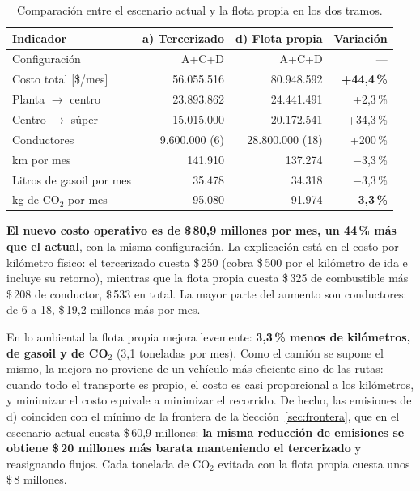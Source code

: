 \documentclass[10pt,a4paper]{article}
\begin{document}
\begin{table}[H]
\centering\small
\caption{Comparación entre el escenario actual y la flota propia en los dos tramos.}
\label{tab:pd}
\begin{tabular}{lrrr}
\toprule
\textbf{Indicador} & \textbf{a) Tercerizado} & \textbf{d) Flota propia} & \textbf{Variación} \\
\midrule
Configuración                      & A+C+D      & A+C+D      & --- \\
Costo total [\$/mes]               & 56.055.516 & 80.948.592 & \textbf{+44,4\,\%} \\
\quad Planta $\to$ centro          & 23.893.862 & 24.441.491 & +2,3\,\% \\
\quad Centro $\to$ súper           & 15.015.000 & 20.172.541 & +34,3\,\% \\
\quad Conductores                  & 9.600.000 (6) & 28.800.000 (18) & +200\,\% \\
km por mes                         & 141.910    & 137.274    & $-$3,3\,\% \\
Litros de gasoil por mes           & 35.478     & 34.318     & $-$3,3\,\% \\
kg de CO$_2$ por mes               & 95.080     & 91.974     & \textbf{$-$3,3\,\%} \\
\bottomrule
\end{tabular}
\end{table}

\textbf{El nuevo costo operativo es de \$\,80,9 millones por mes, un 44\,\%
más que el actual}, con la misma configuración. La explicación está en el
costo por kilómetro físico: el tercerizado cuesta \$\,250 (cobra \$\,500 por
el kilómetro de ida e incluye su retorno), mientras que la flota propia cuesta
\$\,325 de combustible más \$\,208 de conductor, \$\,533 en total. La mayor
parte del aumento son conductores: de 6 a 18, \$\,19,2 millones más por mes.

En lo ambiental la flota propia mejora levemente: \textbf{3,3\,\% menos de
kilómetros, de gasoil y de CO$_2$} (3,1 toneladas por mes). Como el camión se
supone el mismo, la mejora no proviene de un vehículo más eficiente sino de
las rutas: cuando todo el transporte es propio, el costo es casi proporcional a
los kilómetros, y minimizar el costo equivale a minimizar el recorrido. De
hecho, las emisiones de d) coinciden con el mínimo de la frontera de la
Sección~\ref{sec:frontera}, que en el escenario actual cuesta \$\,60,9
millones: \textbf{la misma reducción de emisiones se obtiene \$\,20 millones
más barata manteniendo el tercerizado} y reasignando flujos. Cada tonelada de
CO$_2$ evitada con la flota propia cuesta unos \$\,8 millones.
\end{document}
